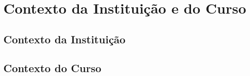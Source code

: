 \newpage
\section{Contexto da Institui\c{c}\~ao e do Curso}

\subsection{Contexto da Institui\c{c}\~ao}


\subsection{Contexto do Curso}
